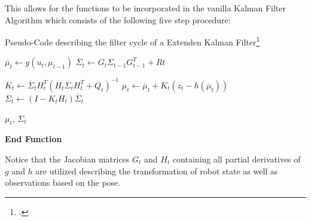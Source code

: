 This allows for the functions to be incorporated in the vanilla Kalman Filter Algorithm which consists of the following five step procedure:

\begin{algorithm}[H]
	\caption{Pseudo-Code describing the filter cycle of a Extenden Kalman Filter\footcite[Page 51]{thrun2002probabilisticRobotics}}
	
	{
		$ \overline{\mu}_{t} \gets g( u_{t}, \mu_{t - 1} ) $\;
		$ \overline{\Sigma}_{t} \gets G_{t} \Sigma_{t-1} G^{T}_{t-1} + R{t} $\;
	
		$ K_{t} \gets \overline{\Sigma}_{t} H^{T}_{t} ( H_{t} \overline{\Sigma}_{t} H^{T}_{t} + Q_{t} )^{-1} $\;
		$ \mu_{t} \gets \overline{\mu}_{t} + K_{t} ( z_{t} - h( \overline{\mu}_{t} ) ) $\;
		$ \overline{\Sigma}_{t} \gets ( I - K_{t} H_{t} ) \overline{\Sigma}_{t} $\;
		
		\Return $\mu_{t}$, $\Sigma_{t}$\;
	}
	\textbf{End Function}	
\end{algorithm}

Notice that the Jacobian matrices $G_{t}$ and $H_{t}$ containing all partial derivatives of $g$ and $h$ are utilized describing the transformation of robot state as well as observations based on the pose.





